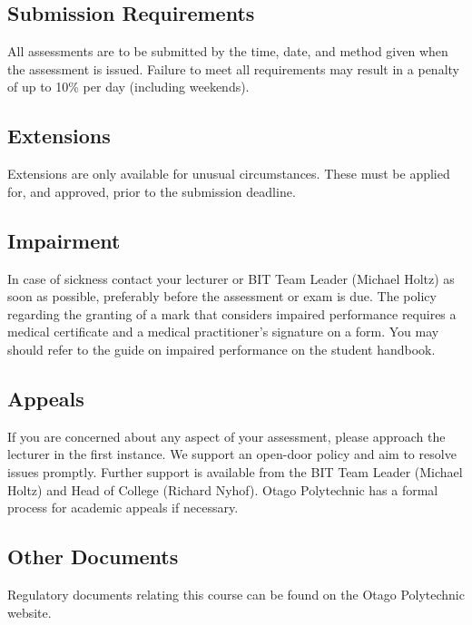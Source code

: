\documentclass{article}
\begin{document}
\subsection*{Submission Requirements}
All assessments are to be submitted by the time, date, and method given when the assessment is issued. Failure to meet all requirements may result in a penalty of up to 10\% per day (including weekends).

\subsection*{Extensions}
Extensions are only available for unusual circumstances. These must be applied for, and approved, prior to the submission deadline.

\subsection*{Impairment}
In case of sickness contact your lecturer or BIT Team Leader (Michael Holtz) as soon as possible, preferably before the assessment or exam is due. The policy regarding the granting of a mark that considers impaired performance requires a medical certificate and a medical practitioner’s signature on a form. You may should refer to the guide on impaired performance on the student handbook.

\subsection*{Appeals}
If you are concerned about any aspect of your assessment, please approach the lecturer in the first instance. We support an open-door policy and aim to resolve issues promptly. Further support is available from the BIT Team Leader (Michael Holtz) and Head of College (Richard Nyhof). Otago Polytechnic has a formal process for academic appeals if necessary.

\subsection*{Other Documents}
Regulatory documents relating this course can be found on the Otago Polytechnic website.
\end{document}
